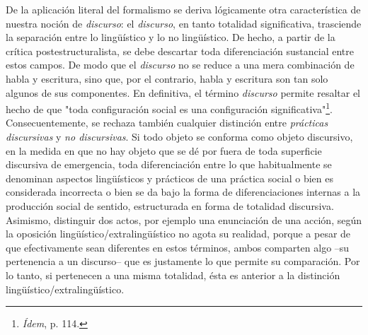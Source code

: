\documentclass{book}
\begin{document}
De la aplicación literal del formalismo se deriva lógicamente otra
característica de nuestra noción de \emph{discurso}: el \emph{discurso},
en tanto totalidad significativa, trasciende la separación entre lo
lingüístico y lo no lingüístico. De hecho, a partir de la crítica
postestructuralista, se debe descartar toda diferenciación sustancial
entre estos campos. De modo que el \emph{discurso} no se reduce a una
mera combinación de habla y escritura, sino que, por el contrario, habla
y escritura son tan solo algunos de sus componentes. En definitiva, el
término \emph{discurso} permite resaltar el hecho de que "toda
configuración social es una configuración significativa"\footnote{\emph{Ídem},
  p. 114.}. Consecuentemente, se rechaza también cualquier distinción
entre \emph{prácticas discursivas} y \emph{no discursivas}. Si todo
objeto se conforma como objeto discursivo, en la medida en que no hay
objeto que se dé por fuera de toda superficie discursiva de emergencia,
toda diferenciación entre lo que habitualmente se denominan aspectos
lingüísticos y prácticos de una práctica social o bien es considerada
incorrecta o bien se da bajo la forma de diferenciaciones internas a la
producción social de sentido, estructurada en forma de totalidad
discursiva. Asimismo, distinguir dos actos, por ejemplo una enunciación
de una acción, según la oposición lingüístico/extralingüístico no agota
su realidad, porque a pesar de que efectivamente sean diferentes en
estos términos, ambos comparten algo --su pertenencia a un discurso--
que es justamente lo que permite su comparación. Por lo tanto, si
pertenecen a una misma totalidad, ésta es anterior a la distinción
lingüístico/extralingüístico.
\end{document}
